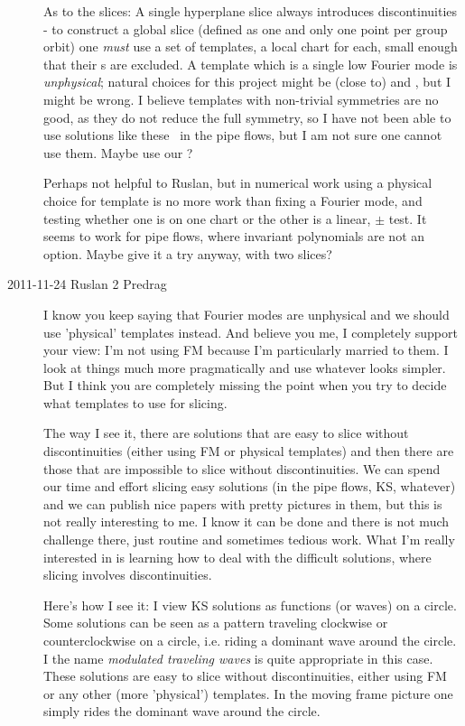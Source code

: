 \begin{description}
As to the slices: A single hyperplane slice always
introduces discontinuities - to construct a global slice (defined as one
and only one point per group orbit) one \emph{must} use a set of
templates, a local chart for each, small enough that their \sset s are
excluded. A template which is a single low Fourier mode is
\emph{unphysical}; natural choices for this project might be (close to)
 and , but I might be wrong. I believe templates with
non-trivial symmetries are no good, as they do not reduce the full
symmetry, so I have not been able to use solutions like these \eqva\ in
the pipe flows, but I am not sure one cannot use them. Maybe use our
?

Perhaps not helpful to Ruslan, but in numerical work using a physical
choice for template is no more work than fixing a Fourier mode, and
testing whether one is on one chart or the other is a linear, $\pm$ test.
It seems to work for pipe flows, where invariant polynomials are not an
option. Maybe give it a try anyway, with two slices?

\item[2011-11-24 Ruslan 2 Predrag] I know you keep saying that Fourier modes are unphysical and we should use 'physical' templates instead.  And believe you me, I completely support your view: I'm not using FM because I'm particularly married to them.  I look at things much more pragmatically and use whatever looks simpler.  But I think you are completely missing the point when you try to decide what templates to use for slicing.

    The way I see it, there are solutions that are easy to slice without discontinuities (either using FM or physical templates) and then there are those that are impossible to slice without discontinuities.  We can spend our time and effort slicing easy solutions (in the pipe flows, KS, whatever) and we can publish nice papers with pretty pictures in them, but this is not really interesting to me.  I know it can be done and there is not much challenge there, just routine and sometimes tedious work.  What I'm really interested in is learning how to deal with the difficult solutions, where slicing involves discontinuities.

    Here's how I see it: I view KS solutions as functions (or waves) on a circle.  Some solutions can be seen as a pattern traveling clockwise or counterclockwise on a circle, i.e. riding a dominant wave around the circle.  I the name {\em modulated traveling waves} is quite appropriate in this case.  These solutions are easy to slice without discontinuities, either using FM or any other (more 'physical') templates.  In the moving frame picture one simply rides the dominant wave around the circle.


\end{description}
